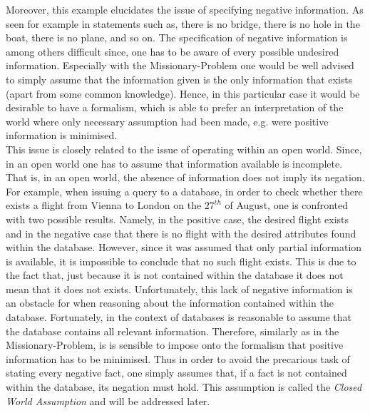 \documentclass{article}
\begin{document}
\linebreak
Moreover, this example elucidates the issue of specifying negative information. As seen for example in statements such as, there is no bridge, there is no hole in the boat, there is no plane, and so on. The specification of negative information is among others difficult since, one has to be aware of every possible undesired information. Especially with the Missionary-Problem one would be well advised to simply assume that the information given is the only information that exists (apart from some common knowledge). Hence, in this particular case it would be desirable to have a formalism, which is able to prefer an interpretation of the world where only necessary assumption had been made, e.g. were positive information is minimised. \\



This issue is closely related to the issue of operating within an open world. Since, in an open world one has to assume that information available is incomplete. That is, in an open world, the absence of information does not imply its negation. For example, when issuing a query to a database, in order to check whether there exists a flight from Vienna to London on the $27^{th}$ of August, one is confronted with two possible results. Namely, in the positive case, the desired flight exists and in the negative case that there is no flight with the desired attributes found within the database. However, since it was assumed that only partial information is available, it is impossible to conclude that no such flight exists. This is due to the fact that, just because it is not contained within the database it does not mean that it does not exists. Unfortunately, this lack of negative information is an obstacle for when reasoning about the information contained within the database. Fortunately, in the context of databases is reasonable to assume that the database contains all relevant information. Therefore, similarly as in the Missionary-Problem, is is sensible to impose onto the formalism that positive information has to be minimised. Thus in order to avoid the precarious task of stating every negative fact, one simply assumes that, if a fact is not contained within the database, its negation must hold. This assumption is called the \emph{Closed World Assumption} and will be addressed later.
\cite{brewka1997nonmonotonic}\\
 
 
 
\end{document}
